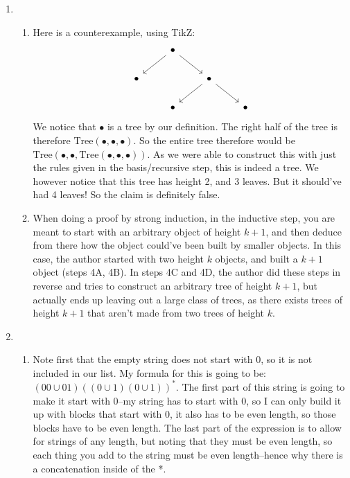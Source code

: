 \documentclass[12pt]{article}
\theoremstyle{definition}
\theoremstyle{remark}
\begin{document}
\begin{enumerate}[leftmargin=\labelsep]
		\newpage
		\item
		\begin{enumerate}
			\item Here is a counterexample, using  TikZ:
			\[\begin{tikzcd}
				& \bullet \\
				\bullet && \bullet \\
				& \bullet && \bullet
				\arrow[from=1-2, to=2-1]
				\arrow[from=1-2, to=2-3]
				\arrow[from=2-3, to=3-2]
				\arrow[from=2-3, to=3-4]
			\end{tikzcd}\]
			We notice that $\bullet$ is a tree by our definition. The right half of the tree is therefore $\mathrm{Tree}(\bullet, \bullet, \bullet)$. So the entire tree therefore would be $\mathrm{Tree}(\bullet, \bullet, \mathrm{Tree}(\bullet, \bullet, \bullet))$. As we were able to construct this with just the rules given in the basis/recursive step, this is indeed a tree. We however notice that this tree has height 2, and 3 leaves. But it should've had 4 leaves! So the claim is definitely false.
			
			\item When doing a proof by strong induction, in the inductive step, you are meant to start with an arbitrary object of height $k+1$, and then deduce from there how the object could've been built by smaller objects. In this case, the author started with two height $k$ objects, and built a $k+1$ object (steps 4A, 4B). In steps 4C and 4D, the author did these steps in reverse and tries to construct an arbitrary tree of height $k+1$, but actually ends up leaving out a large class of trees, as there exists trees of height $k+1$ that aren't made from two trees of height $k$.
		\end{enumerate}
	
		\newpage
		\item 
		\begin{enumerate}
			\item Note first that the empty string does not start with $0$, so it is not included in our list. My formula for this is going to be: $(00 \cup 01)((0 \cup 1)(0 \cup 1))^*$. The first part of this string is going to make it start with 0--my string has to start with 0, so I can only build it up with blocks that start with 0, it also has to be even length, so those blocks have to be even length. The last part of the expression is to allow for strings of any length, but noting that they must be even length, so each thing you add to the string must be even length--hence why there is a concatenation inside of the *. 
			

\end{enumerate}
\end{enumerate}
\end{document}
